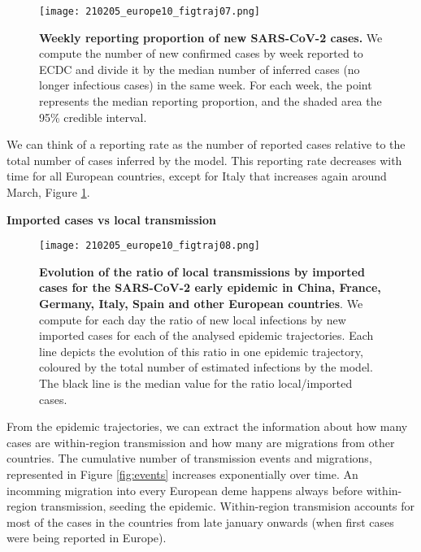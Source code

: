\begin{figure}[ht]
    \centering
    \texttt{[image: 210205\_europe10\_figtraj07.png]}
    \caption{\textbf{Weekly reporting proportion of new SARS-CoV-2 cases.} We compute the number of new confirmed cases by week reported to ECDC and divide it by the median number of inferred cases (no longer infectious cases) in the same week. For each week, the point represents the median reporting proportion, and the shaded area the 95\% credible interval.}
    \label{fig:reported}
\end{figure}


We can think of a reporting rate as the number of reported cases relative to the total number of cases inferred by the model. This reporting rate decreases with time for all European countries, except for Italy that increases again around March, Figure \ref{fig:reported}. 




\textbf{Imported cases vs local transmission}

\begin{figure}[ht]
    \centering
    \texttt{[image: 210205\_europe10\_figtraj08.png]}
    \caption{\textbf{Evolution of the ratio of local transmissions by imported cases for the SARS-CoV-2 early epidemic in China, France, Germany, Italy, Spain and other European countries}. We compute for each day the ratio of new local infections by new imported cases for each of the analysed epidemic trajectories. Each line depicts the evolution of this ratio in one epidemic trajectory, coloured by the total number of estimated infections by the model. The black line is the median value for the ratio local/imported cases.}
    \label{fig:localvsimported}
\end{figure}



From the epidemic trajectories, we can extract the information about how many cases are within-region transmission and how many are migrations from other countries. The cumulative number of transmission events and migrations, represented in Figure \ref{fig:events} increases exponentially over time. An incomming migration into every European deme happens always before within-region transmission, seeding the epidemic. Within-region transmision accounts for most of the cases in the countries from late january onwards (when first cases were being reported in Europe).




